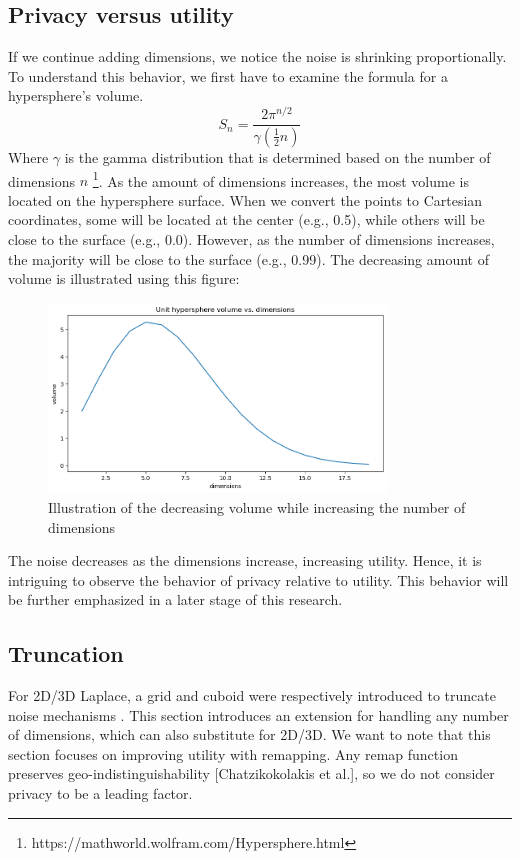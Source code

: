 \subsection{Privacy versus utility} \label{theory:privacy-utility-nd}
If we continue adding dimensions, we notice the noise is shrinking proportionally.
To understand this behavior, we first have to examine the formula for a hypersphere’s volume.
\begin{equation}
  S_n = \frac{2 \pi^{n/2}}{\gamma(\frac{1}{2}n)}
\end{equation}
Where $\gamma$ is the gamma distribution that is determined based on the number of dimensions $n$ \footnote{https://mathworld.wolfram.com/Hypersphere.html}.
As the amount of dimensions increases, the most volume is located on the hypersphere surface.
When we convert the points to Cartesian coordinates, some will be located at the center (e.g., 0.5), while others will be close to the surface (e.g., 0.0).
However, as the number of dimensions increases, the majority will be close to the surface (e.g., 0.99).
The decreasing amount of volume is illustrated using this figure:
\begin{figure}[H]
  \includegraphics[width=0.8\textwidth]{TheorethicalFramework/ND-Laplace/Images/volume.png}
  \caption{Illustration of the decreasing volume while increasing the number of dimensions}
  \label{fig:curse-of-dimensionality}
\end{figure}

The noise decreases as the dimensions increase, increasing utility.
Hence, it is intriguing to observe the behavior of privacy relative to utility.
This behavior will be further emphasized in a later stage of this research.
\newpage
\subsection{Truncation}
For 2D/3D Laplace, a grid and cuboid were respectively introduced to truncate noise mechanisms \citep{DBLP:journals/corr/abs-1212-1984,9646489}.
This section introduces an extension for handling any number of dimensions, which can also substitute for 2D/3D. We want to note that this section focuses on improving utility with remapping.
Any remap function preserves geo-indistinguishability [Chatzikokolakis et al.], so we do not consider privacy to be a leading factor.

